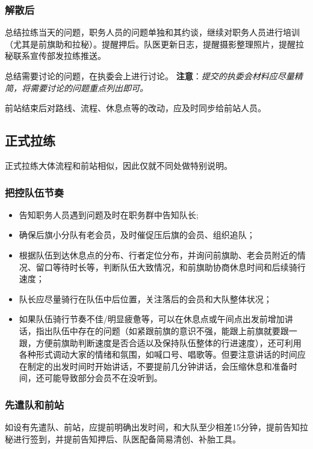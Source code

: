 \documentclass[UTF8]{ctexart}
\begin{document}
\subsubsection{解散后}

总结拉练当天的问题，职务人员的问题单独和其约谈，继续对职务人员进行培训（尤其是前旗助和拉秘）。提醒押后。队医更新日志，提醒摄影整理照片，提醒拉秘联系宣传部发拉练推送。

总结需要讨论的问题，在执委会上进行讨论。
\textbf{注意}：\textit{提交的执委会材料应尽量精简，将需要讨论的问题重点列出即可。}

前站结束后对路线、流程、休息点等的改动，应及时同步给前站人员。

\subsection{正式拉练}

正式拉练大体流程和前站相似，因此仅就不同处做特别说明。

\subsubsection{把控队伍节奏}

\begin{itemize}[nosep,left=2em]
    \item 告知职务人员遇到问题及时在职务群中告知队长;
    \item 确保后旗小分队有老会员，及时催促压后旗的会员、组织追队；
    \item 根据队伍到达休息点的分布、行者定位分布，并询问前旗助、老会员附近的情况、留口等待时长等，判断队伍大致情况，和前旗助协商休息时间和后续骑行速度；
    \item 队长应尽量骑行在队伍中后位置，关注落后的会员和大队整体状况；
    \item 如果队伍骑行节奏不佳/明显疲惫等，可以在休息点或午间点出发前增加讲话，指出队伍中存在的问题（如紧跟前旗的意识不强，能跟上前旗就要跟一跟，方便前旗助判断速度是否合适以及保持队伍整体的行进速度），还可利用各种形式调动大家的情绪和氛围，如喊口号、唱歌等。但要注意讲话的时间应在制定的出发时间时开始讲话，不要提前几分钟讲话，会压缩休息和准备时间，还可能导致部分会员不在没听到。
\end{itemize}

\subsubsection{先遣队和前站}

如设有先遣队、前站，应提前明确出发时间，和大队至少相差15分钟，提前告知拉秘进行签到，并提前告知押后、队医配备简易清创、补胎工具。
\end{document}
